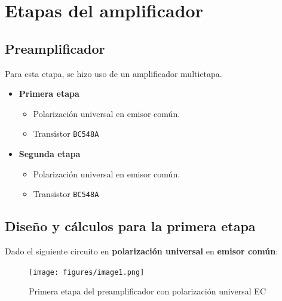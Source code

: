 \documentclass[a4paper, 12pt]{article}
\begin{document}
\section{Etapas del amplificador}

\subsection{Preamplificador}
Para esta etapa, se hizo uso de un amplificador multietapa.
\begin{itemize}
    \item \textbf{Primera etapa}
        \begin{itemize}
            \item Polarización universal en emisor común.
            \item Transistor \verb|BC548A|
        \end{itemize}

    \item \textbf{Segunda etapa}
        \begin{itemize}
            \item Polarización universal en emisor común.
            \item Transistor \verb|BC548A|
        \end{itemize}
\end{itemize}

\newpage
\subsection{Diseño y cálculos para la primera etapa}
Dado el siguiente circuito en \textbf{polarización universal} en \textbf{emisor común}:  
\begin{figure}[H]
    \centering
    \texttt{[image: figures/image1.png]}
    \caption{Primera etapa del preamplificador con polarización universal EC}
    \label{fig:image1}
\end{figure}
\end{document}
